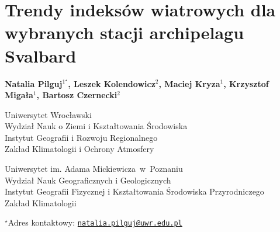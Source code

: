 \documentclass[\main/boa.tex]{subfiles}
\begin{document}
\sloppy


\section{Trendy indeksów wiatrowych dla wybranych stacji archipelagu Svalbard}

\begin{center}
  {\bf {} Natalia Pilguj$^{1^\star}$,  Leszek Kolendowicz$^{2}$,  Maciej Kryza$^{1}$,  Krzysztof Migała$^{1}$,  Bartosz Czernecki$^{2}$}
\end{center}

\vskip 0.3cm

\begin{affiliations}
\begin{enumerate}
\begin{minipage}{0.915\textwidth}
\centering
\item Uniwersytet Wrocławski\\ Wydział Nauk o Ziemi i Kształtowania Środowiska\\Instytut Geografii i Rozwoju Regionalnego\\Zakład Klimatologii i Ochrony Atmosfery\\[-2pt]
\item Uniwersytet im. Adama Mickiewicza~w~Poznaniu \\ Wydział Nauk Geograficznych i Geologicznych  \\ Instytut Geografii Fizycznej i Kształtowania Środowiska Przyrodniczego\\
Zakład Klimatologii \\[-2pt]
\end{minipage}
\end{enumerate}
$^\star$Adres kontaktowy: \href{mailto:natalia.pilguj@uwr.edu.pl}{\nolinkurl{natalia.pilguj@uwr.edu.pl}}\\
\end{affiliations}

\vskip 0.5cm


\vskip 0.5cm
\end{document}
